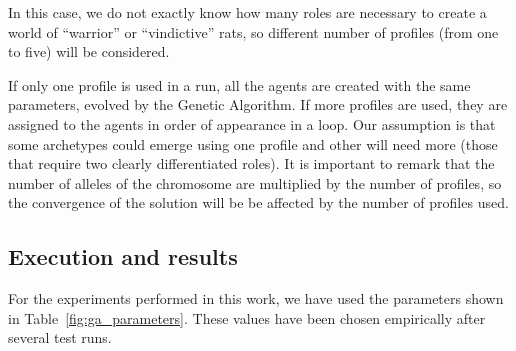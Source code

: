 \documentclass[letterpaper]{article}
\begin{document}

In this case,
 we do not exactly know how many roles are necessary to create a world of ``warrior'' or ``vindictive''
  rats, so different number of profiles (from one to five) will be considered.



If only one profile is used
in a run, all the agents are created with the same parameters, evolved
by the Genetic Algorithm. If more profiles are used, they are assigned
to the agents in order of appearance in a loop. Our assumption is that
some archetypes could emerge using one profile and other will need
more (those that require two clearly differentiated roles). It is
important to remark that the number of alleles of the chromosome are
multiplied by the number of profiles, so the convergence of the
solution will be be affected by the number of profiles used. 




\subsection{Execution and results}

For the experiments performed in this work, we have used the parameters shown in Table~\ref{fig:ga_parameters}. These values have been chosen empirically after several test runs.
\end{document}
